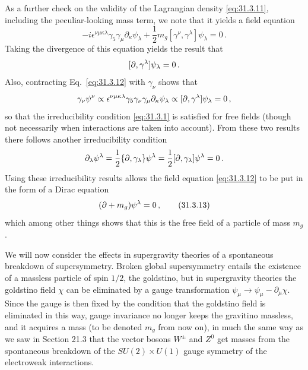 As a further check on the validity of the Lagrangian density
\eqref{eq:31.3.11}, including the peculiar-looking mass term, we note that
it yields a field equation
\begin{equation}
  -i\epsilon^{\nu\mu\kappa\lambda}\gamma_5\gamma_\mu
  \partial_\kappa\psi_\lambda
  +\frac12m_g[\gamma^\nu,\gamma^\lambda]\psi_\lambda=0\,.
  \tag{31.3.12}\label{eq:31.3.12}
\end{equation}
Taking the divergence of this equation yields the result that
\[
  [\sl{\partial},\gamma^\lambda]\psi_\lambda=0\,.
\]
Also, contracting Eq.~\eqref{eq:31.3.12} with \(\gamma_\nu\) shows that
\[
  \gamma_\nu\psi^\nu
  \propto\epsilon^{\nu\mu\kappa\lambda}
  \gamma_5\gamma_\nu\gamma_\mu\partial_\kappa\psi_\lambda
  \propto[\sl{\partial},\gamma^\lambda]\psi_\lambda=0\,,
\]
so that the irreducibility condition \eqref{eq:31.3.1} is satisfied for
free fields (though not necessarily when interactions are taken into
account). From these two results there follows another irreducibility
condition
\[
  \partial_\lambda\psi^\lambda
  =\frac12\{\sl{\partial},\gamma_\lambda\}\psi^\lambda
  =\frac12[\sl{\partial},\gamma_\lambda]\psi^\lambda=0\,.
\]
Using these irreducibility results allows the field equation
\eqref{eq:31.3.12} to be put in the form of a Dirac equation
\begin{equation}
  (\sl{\partial}+m_g)\psi^\lambda=0\,,
  \tag{31.3.13}\label{eq:31.3.13}
\end{equation}
which among other things shows that this is the free field of a particle
of mass \(m_g\).

We will now consider the effects in supergravity theories of a spontaneous
breakdown of supersymmetry. Broken global supersymmetry entails the
existence of a massless particle of spin \(1/2\), the goldstino, but in
supergravity theories the goldstino field \(\chi\) can be eliminated by a
gauge transformation
\(\psi_\mu\to\psi_\mu-\partial_\mu\chi\). Since the gauge is then fixed by
the condition that the goldstino field is eliminated in this way, gauge
invariance no longer keeps the gravitino massless, and it acquires a mass
(to be denoted \(m_g\) from now on), in much the same way as we saw in
Section 21.3 that the vector bosons \(W^\pm\) and \(Z^0\) get masses from
the spontaneous breakdown of the
\(SU(2)\times U(1)\) gauge symmetry of the electroweak interactions.

